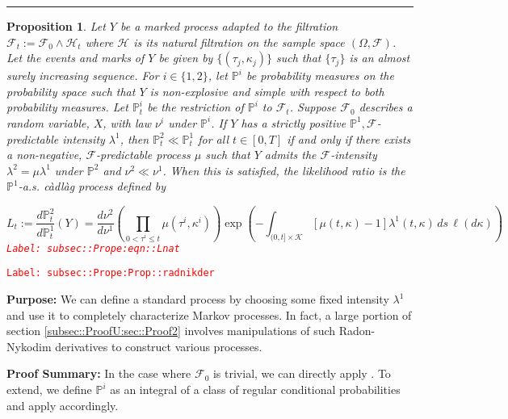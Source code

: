 \documentclass[12pt]{article}
\newcommand{\mb}{\mathbb}
\newcommand{\mc}{\mathcal}
\newcommand{\tr}{\textcolor{red}}
\newcommand{\labe}[1]{\tr{\texttt{Label: #1}}}
\newcommand{\purpose}{\textbf{Purpose: }}
\newcommand{\pfsum}{\textbf{Proof Summary: }}
\newcommand{\lin}{\rule{\linewidth}{0.4 pt}}
\newcommand{\pr}{\mb{P}}							%
\newtheorem{prop}[thms]{Proposition}
\begin{document}
\lin

\begin{prop}
Let \(Y\) be a marked process adapted to the filtration \(\mc{F}_t := \mc{F}_0\wedge \mc{H}_t\) where \(\mc{H}\) is its natural filtration on the sample space \((\Omega,\mc{F})\). Let the events and marks of \(Y\) be given by \(\{(\tau_j,\kappa_j)\}\) such that \(\{\tau_j\}\) is an almost surely increasing sequence. For \(i \in \{1,2\}\), let \(\pr^i\) be probability measures on the probability space such that \(Y\) is non-explosive and simple with respect to both probability measures. Let \(\pr^i_t\) be the restriction of \(\pr^i\) to \(\mc{F}_t\). Suppose \(\mc{F}_0\) describes a random variable, \(X\), with law \(\nu^i\) under \(\pr^i\). If \(Y\) has a strictly positive \(\pr^1,\mc{F}\)-predictable intensity \(\lambda^1\), then \(\pr^2_t \ll \pr^1_t\) for all \(t \in [0,T]\) if and only if there exists a non-negative, \(\mc{F}\)-predictable process \(\mu\) such that \(Y\) admits the \(\mc{F}\)-intensity \(\lambda^2 = \mu\lambda^1\) under \(\pr^2\) and \(\nu^2 \ll \nu^1\). When this is satisfied, the likelihood ratio is the \(\pr^1\)-a.s. c\`adl\`ag process defined by 

\begin{equation}
L_t:= \frac{d\pr^2_t}{d\pr^1_t}(Y) = \frac{d\nu^2}{d\nu^1}\left(\prod_{0<\tau^i\leq t} \mu(\tau^i,\kappa^i)\right)\exp\left(-\int_{(0,t]\times \mc{K}}[\mu(t,\kappa) - 1]\lambda^1(t,\kappa)\,ds\,\ell(d\kappa)\right)
\label{subsec::Prope:eqn::Lnat}
\end{equation}
\labe{subsec::Prope:eqn::Lnat}
\label{subsec::Prope:Prop::radnikder}
\end{prop}
\labe{subsec::Prope:Prop::radnikder}

\purpose We can define a standard process by choosing some fixed intensity \(\lambda^1\) and use it to completely characterize Markov processes. In fact, a large portion of section \ref{subsec::ProofU:sec::Proof2} involves manipulations of such Radon-Nykodim derivatives to construct various processes.

\pfsum In the case where \(\mc{F}_0\) is trivial, we can directly apply \cite[Theorem 14.4.I]{DalVer08}. To extend, we define \(\pr^i\) as an integral of a class of regular conditional probabilities and apply \cite[Theorem 14.4.I]{DalVer08} accordingly.
\end{document}
